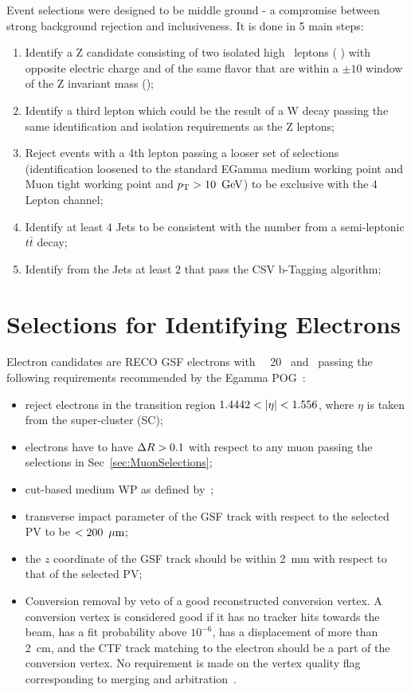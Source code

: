 Event selections were designed to be middle ground - a compromise between strong background rejection and inclusiveness. It is done in 5 main steps:
\begin{enumerate}
\item Identify a Z candidate consisting of two isolated high \pt \ leptons ( \GeV ) with opposite electric charge and of the same flavor that are within a $\pm 10$ \GeV window of the Z invariant mass (\zmass);
\item Identify a third lepton which could be the result of a W decay passing the same identification and isolation requirements as the Z leptons;
\item Reject events with a 4th lepton passing a looser set of selections (identification loosened to the standard EGamma medium working point and Muon tight working point and $p_{\mathrm{T}} > 10 \ \,\text{Ge\hspace{-.08em}V}$) to be exclusive with the 4 Lepton channel;
\item Identify at least 4 Jets to be consistent with the number from a semi-leptonic $t\bar{t}$ decay;
\item Identify from the Jets at least 2 that pass the CSV b-Tagging algorithm;
\end{enumerate}	 
	 
\section{Selections for Identifying Electrons}
\label{sec:ElectronSelections}

Electron candidates are RECO GSF electrons with \pt\ \gt\ 20 \GeV\ and \absetaele\ passing the following requirements recommended by the Egamma POG~\cite{egammaidtwiki}:
\begin{itemize}
\item reject electrons in the transition region $1.4442 < \left|\eta\right| < 1.556$, where $\eta$ is taken from the super-cluster (SC);
\item electrons have to have $\Delta R >0.1$ with respect to any muon passing the selections in Sec~\ref{sec:MuonSelections};
\item cut-based medium WP as defined by~\cite{egammaidtwiki};
\item transverse impact parameter of the GSF track with respect to the selected PV to be $<200~\,\mu\text{m}$;
\item the $z$ coordinate of the GSF track should be within 2~mm with respect to that of the selected PV;
\item Conversion removal by veto of a good reconstructed conversion vertex.  A conversion vertex is considered good if it has no tracker hits towards the beam, has a fit probability above $10^{-6}$, has a displacement of more than 2~cm, and the  CTF track matching to the electron should be a part of the conversion vertex. No requirement is made on the vertex quality flag corresponding to merging and arbitration~\cite{hwwsmurf}.
\end{itemize}

